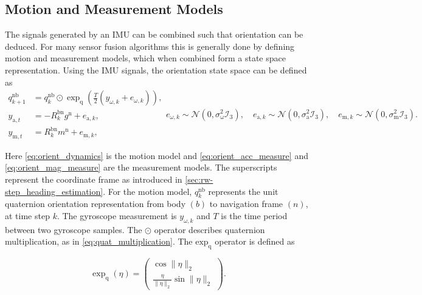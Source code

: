 \subsection{Motion and Measurement Models}
\label{sec:motion_and_measurement_models}
The signals generated by an \ac{IMU} can be combined such that orientation can be deduced. For many sensor fusion algorithms this is generally done by defining motion and measurement models, which when combined form a state space representation. Using the \ac{IMU} signals, the orientation state space can be defined \cite{Kok2017} as 
\begin{subequations}
	\begin{align}
		\label{eq:orient_dynamics}
		q_{k+1}^{\mathrm{nb}} &=q_{k}^{\mathrm{nb}} \odot \exp _{\mathrm{q}}\left(\frac{T}{2}\left(y_{\omega, k}+e_{\omega, k}\right)\right), 	\\ 
		\label{eq:orient_acc_measure}
		y_{\mathrm{a}, t} &=-R_{k}^{\mathrm{bn}} g^{\mathrm{n}}+e_{\mathrm{a}, k},\\ 
		\label{eq:orient_mag_measure}
		y_{\mathrm{m}, t} &=R_{k}^{\mathrm{bn}} m^{\mathrm{n}}+e_{\mathrm{m}, k}, 
	\end{align}
	\begin{equation}
		\label{eq:orient_ss_noise}
		e_{\omega, k} \sim \mathcal{N}\left(0, \sigma_{\mathrm{\omega}}^{2} \mathcal{I}_{3}\right), 
		\quad 
		e_{\mathrm{a}, k} \sim \mathcal{N}\left(0, \sigma_{\mathrm{a}}^{2} \mathcal{I}_{3}\right), 
		\quad 
		e_{\mathrm{m}, k} \sim \mathcal{N}\left(0, \sigma_{\mathrm{m}}^{2} \mathcal{I}_{3}\right).
	\end{equation}
	\label{eq:orient_state_space}
\end{subequations}

Here \eqref{eq:orient_dynamics} is the motion model and \eqref{eq:orient_acc_measure} and \eqref{eq:orient_mag_measure} are the measurement models. The superscripts represent the coordinate frame as introduced in \cref{sec:rw-step_heading_estimation}.
For the motion model, $q^{\mathrm{nb}}_k$ represents the unit quaternion orientation representation from body $(b)$ to navigation frame $(n)$, at time step $ k $.  The gyroscope measurement is $y_{\omega, k}$ and $T$ is the time period between two gyroscope samples. The $\odot$ operator describes quaternion multiplication, as in \eqref{eq:quat_multiplication}. The $\text{exp}_\text{q}$ operator is defined as

\begin{equation}
	\exp_\mathrm{q} (\eta) = \left(\begin{array}{c}{\cos \|\eta\|_{2}} \\ {\frac{\eta}{\|\eta\|_{2}} \sin \|\eta\|_{2}}\end{array}\right) \label{eq:exp_q_in_text}.
\end{equation}

